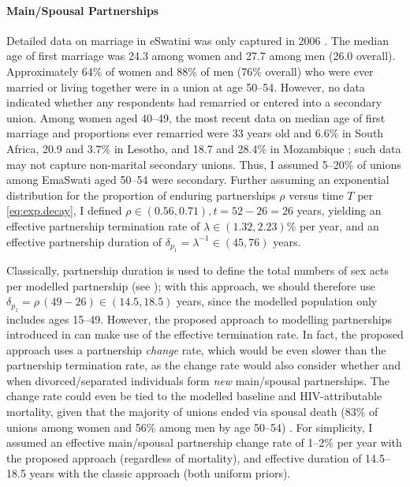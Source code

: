 \paragraph{Main/Spousal Partnerships}
Detailed data on marriage in eSwatini was only captured in 2006 \cite[Table~6.1]{SDHS2006}.
The median age of first marriage was 24.3 among women and 27.7 among men (26.0 overall).
Approximately 64\% of women and 88\% of men (76\% overall) who were ever married or living together
were in a union at age 50--54.
However, no data indicated whether any respondents had remarried or entered into a secondary union.
Among women aged 40--49, the most recent data on
median age of first marriage and proportions ever remarried were
33 years old and 6.6\% in South Africa,
20.9 and 3.7\% in Lesotho, and 18.7 and 28.4\% in Mozambique \cite{John2022};
such data may not capture non-marital secondary unions.
Thus, I assumed 5--20\% of unions among EmaSwati aged 50--54 were secondary.
Further assuming an exponential distribution for
the proportion of enduring partnerships $\rho$ versus time $T$ per \eqref{eq:exp.decay},
I defined $\rho \in (0.56, 0.71), t = 52 - 26 = 26$ years, yielding
an effective partnership termination rate of $\lambda \in (1.32, 2.23)\%$ per year, and
an effective partnership duration of $\delta_{p_{1}} = \lambda^{-1} \in (45, 76)$ years.
\par
Classically, partnership duration is used to define
the total numbers of sex acts per modelled partnership (see );
with this approach, we should therefore use $\delta_{p_{1}} = \rho\,(49 - 26) \in (14.5, 18.5)$ years,
since the modelled population only includes ages 15--49.
However, the proposed approach to modelling partnerships introduced in 
can make use of the effective termination rate.
In fact, the proposed approach uses a partnership \emph{change} rate,
which would be even slower than the partnership termination rate,
as the change rate would also consider whether and when
divorced/separated individuals form \emph{new} main/spousal partnerships.
The change rate could even be tied to the modelled baseline and HIV-attributable mortality,
given that the majority of unions ended via spousal death
(83\% of unions among women and 56\% among men by age 50--54) \cite{SDHS2006}.
For simplicity, I assumed an effective main/spousal partnership change rate of 1--2\% per year
with the proposed approach (regardless of mortality),
and effective duration of 14.5--18.5 years with the classic approach (both uniform priors).
